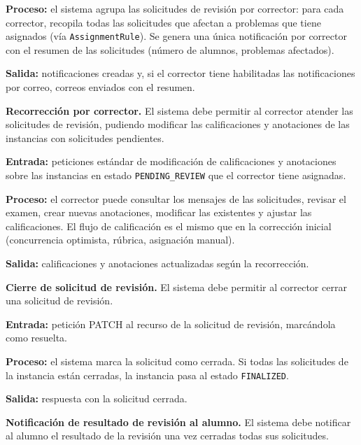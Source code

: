 \begin{functional}
    \textbf{Proceso:} el sistema agrupa las solicitudes de revisión por corrector: para cada
    corrector, recopila todas las solicitudes que afectan a problemas que tiene asignados
    (vía \texttt{AssignmentRule}). Se genera una única notificación por corrector con el
    resumen de las solicitudes (número de alumnos, problemas afectados).

    \textbf{Salida:} notificaciones creadas y, si el corrector tiene habilitadas las
    notificaciones por correo, correos enviados con el resumen.

    \item \textbf{Recorrección por corrector.} \label{rf:review:regrade}
    El sistema debe permitir al corrector atender las solicitudes de revisión, pudiendo
    modificar las calificaciones y anotaciones de las instancias con solicitudes pendientes.

    \textbf{Entrada:} peticiones estándar de modificación de calificaciones y anotaciones
    sobre las instancias en estado \texttt{PENDING\_REVIEW} que el corrector tiene
    asignadas.

    \textbf{Proceso:} el corrector puede consultar los mensajes de las solicitudes, revisar
    el examen, crear nuevas anotaciones, modificar las existentes y ajustar las
    calificaciones. El flujo de calificación es el mismo que en la corrección inicial
    (concurrencia optimista, rúbrica, asignación manual).

    \textbf{Salida:} calificaciones y anotaciones actualizadas según la recorrección.

    \item \textbf{Cierre de solicitud de revisión.} \label{rf:review:close_request}
    El sistema debe permitir al corrector cerrar una solicitud de revisión.

    \textbf{Entrada:} petición PATCH al recurso de la solicitud de revisión, marcándola
    como resuelta.

    \textbf{Proceso:} el sistema marca la solicitud como cerrada. Si todas las solicitudes
    de la instancia están cerradas, la instancia pasa al estado \texttt{FINALIZED}.

    \textbf{Salida:} respuesta con la solicitud cerrada.

    \item \textbf{Notificación de resultado de revisión al alumno.}
    \label{rf:review:result}
    El sistema debe notificar al alumno el resultado de la revisión una vez cerradas todas
    sus solicitudes.


\end{functional}
